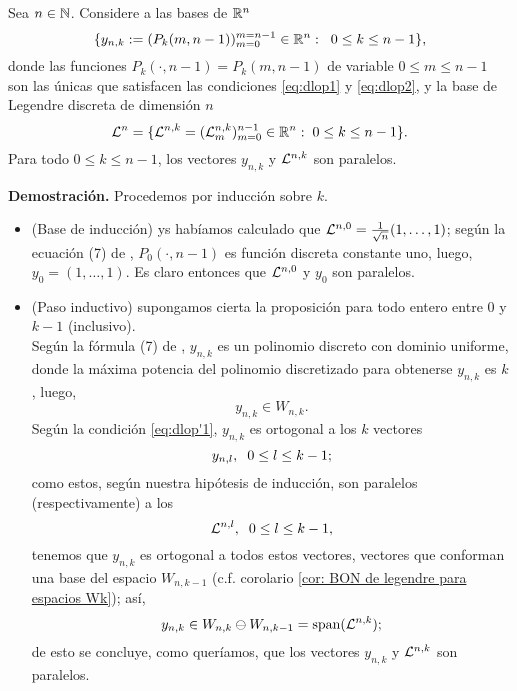 \begin{lema}
\label{prop: legendre y DLOPS son paralelos}
Sea $n \in \mathbb{N}$. 
Considere a 
las bases de $\mathbb{R}^{n}$
\begin{equation}
\label{eq0: base DLOP}
\{
y_{n,k}:= (P_{k}(m, n-1))_{m=0}^{m=n-1} \in \mathbb{R}^{n}
: \hspace{0.2cm} 0 \leq k \leq n-1
\},
\end{equation}
donde las funciones $P_{k}(\cdot , n-1)= P_{k}(m , n-1)$ de variable 
$0 \leq m \leq n-1$
son las únicas que satisfacen las condiciones
\eqref{eq:dlop1} y \eqref{eq:dlop2},
y la base de Legendre discreta de dimensión $n$
\begin{equation}
\label{eq0: base de Legendre discreta}
\mathcal{L}^{n}=\{ \mathcal{L}^{n,k}= (\mathcal{L}_{m}^{n,k})_{m=0}^{n-1} \in \mathbb{R}^{n} : 
\hspace{0.1cm} 0 \leq k \leq n-1\}.
\end{equation}
Para todo $0 \leq k \leq n-1$, los vectores 
$y_{n,k}$ y $\mathcal{L}^{n,k}$ son paralelos.
\end{lema}
\noindent
\textbf{Demostración.}
Procedemos por inducción sobre $k$.
\begin{itemize}
	\item  (Base de inducción) ys habíamos calculado que
	$\mathcal{L}^{n,0}=\frac{1}{\sqrt{n}}(1, \ldots , 1)$; 
	según la ecuación (7) de \cite{Neuman},
	 $P_{0}(\cdot , n-1)$ es función discreta constante uno, 
	luego, $y_{0}=(1, \ldots , 1)$. 
	Es	
	claro entonces que $\mathcal{L}^{n,0}$ 
	y $y_{0}$	
	son paralelos.
	
	\item (Paso inductivo) supongamos cierta la proposición para
	todo entero entre 0 y $k-1$ (inclusivo).	\\
	Según la fórmula (7) de
	\cite{Neuman}, $y_{n,k}$ es
	un polinomio discreto con dominio 
	uniforme, donde la máxima potencia
	del polinomio discretizado para obtenerse 
	$y_{n,k}$ es $k$, luego,
	\[
	y_{n,k} \in W_{n,k}.
	\]	
	Según la condición \eqref{eq:dlop'1}, $y_{n,k}$ es ortogonal a
	los $k$ vectores
	\[
	y_{n,l}, \hspace{0.2cm} 0 \leq l \leq k-1;
	\] 
	como estos, según
	nuestra hipótesis de inducción, son paralelos (respectivamente)
	a los
	\[
	\mathcal{L}^{n, l}, \hspace{0.2cm} 0 \leq l \leq k-1,
	\] 
	tenemos que $y_{n,k}$ es ortogonal a todos estos vectores,
	vectores que conforman una base del espacio $W_{n,k-1}$
	(c.f. corolario \ref{cor: BON de legendre para espacios Wk}); así,
	\[
	y_{n,k} \in W_{n,k} 
	\ominus W_{n,k-1}=\text{span}(\mathcal{L}^{n,k});
	\]
	de esto se concluye, como queríamos, que los vectores 
	$y_{n,k}$ y $\mathcal{L}^{n,k}$
	son paralelos. \QEDB 
\end{itemize}
\vspace{0.2cm}



